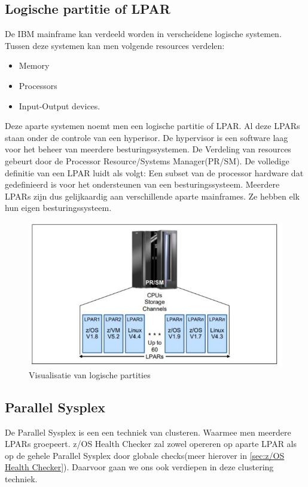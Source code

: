 \subsection{Logische partitie of LPAR}
\label{subsec:Logische partitie of LPAR}
De IBM mainframe kan verdeeld worden in verscheidene logische systemen. Tussen deze systemen kan men volgende resources verdelen:
\begin{itemize}
	\item Memory
	\item Processors
	\item Input-Output devices.
\end{itemize}
Deze aparte systemen noemt men een logische partitie of LPAR. Al deze LPARs staan onder de controle van een hyperisor. De hypervisor is een software laag voor het beheer van meerdere besturingssystemen. De Verdeling van resources gebeurt door de Processor Resource/Systems Manager(PR/SM). De volledige definitie van een LPAR luidt als volgt: Een subset van de processor hardware dat gedefinieerd is voor het ondersteunen van een besturingssysteem. Meerdere LPARs zijn dus gelijkaardig aan verschillende aparte mainframes. Ze hebben elk hun eigen besturingssysteem. \cite{Ebbers2011}

\begin{figure}[h]
	\centering
	\includegraphics{img/LPAR}
	\caption[Logische Partities]{Visualisatie van logische partities}
	\label{fig:lpar}
\end{figure}


\subsection{Parallel Sysplex}
\label{subsec:Parallel Sysplex}

De Parallel Sysplex is een een techniek van clusteren. Waarmee men meerdere LPARs groepeert.  z/OS Health Checker zal zowel opereren op aparte LPAR als op de gehele Parallel Sysplex door globale checks(meer hierover in \ref{sec:z/OS Health Checker}). Daarvoor gaan we ons ook verdiepen in deze clustering techniek.

